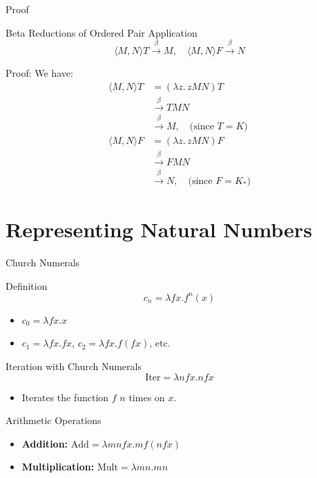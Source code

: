 \documentclass{beamer}
\begin{document}
\begin{frame}{Proof}
  \begin{block}{Beta Reductions of Ordered Pair Application}
    \[
      \langle M, N \rangle T \xrightarrow{\beta} M, \quad \langle M, N \rangle F \xrightarrow{\beta} N
    \]
  \end{block}
  Proof:  
  We have:
  \begin{align*}
    \langle M, N \rangle T &= (\lambda z.\, z M N) T \\
    &\xrightarrow{\beta} T M N \\
    &\xrightarrow{\beta} M, \quad \text{(since } T = K \text{)} \\[10pt]
    \langle M, N \rangle F &= (\lambda z.\, z M N) F \\
    &\xrightarrow{\beta} F M N \\
    &\xrightarrow{\beta} N, \quad \text{(since } F = K_* \text{)}
  \end{align*}
\end{frame}
\section{Representing Natural Numbers}
\begin{frame}{Church Numerals}
  \begin{block}{Definition}
    \[
    c_n = \lambda f x. f^n(x)
    \]
    \begin{itemize}
      \item \(c_0 = \lambda f x. x\)
      \item \(c_1 = \lambda f x. f x\), \(c_2 = \lambda f x. f (f x)\), etc.
    \end{itemize}
  \end{block}
\end{frame}

\begin{frame}{Iteration with Church Numerals}
  \[
    \text{Iter} = \lambda nfx. n f x
  \]
  \begin{itemize}
    \item Iterates the function \(f\) \(n\) times on \(x\).
  \end{itemize}
\end{frame}

\begin{frame}{Arithmetic Operations}
  \begin{itemize}
    \item \textbf{Addition:} \( \text{Add} = \lambda m n f x. m f (n f x) \)
    \item \textbf{Multiplication:} \( \text{Mult} = \lambda m n. m n \)
  \end{itemize}
\end{frame}
\end{document}
